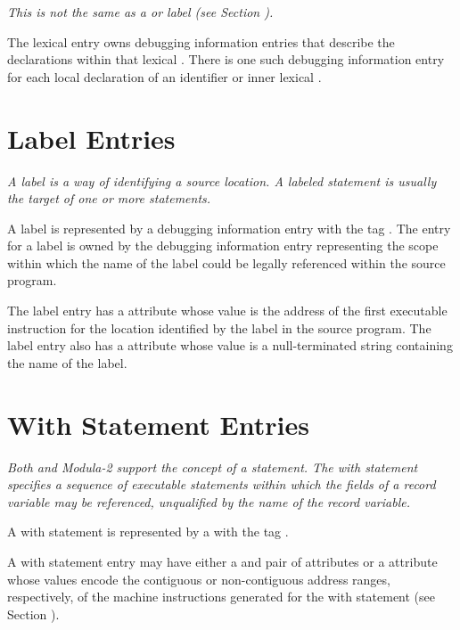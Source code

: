 \textit{This is not the same as a  or
 label (see Section ).}

The lexical  entry owns debugging
information entries that describe the declarations
within that lexical . There is
one such debugging information entry for each local declaration
of an identifier or inner lexical .

\section{Label Entries}
\label{chap:labelentries}
\textit{A label is a way of identifying a source location.
A labeled statement is usually the target of one or more
 statements.}

A label is represented by a debugging information entry with
 the tag \DWTAGlabelTARG.
The entry for a label is owned by
the debugging information entry representing the scope within
which the name of the label could be legally referenced within
the source program.

The label entry has a \DWATlowpc{} attribute whose value
is the address of the first executable instruction for the
location identified by the label in
the source program.  The label entry also has a
\DWATname{} attribute
whose value is a null-terminated string containing
the name of the label.


\section{With Statement Entries}
\label{chap:withstatemententries}

\textit{Both  and
Modula-2 support the concept of a 
statement. The with statement specifies a sequence of
executable statements within which the fields of a record
variable may be referenced, unqualified by the name of the
record variable.}

A with statement is represented by a
with the tag \DWTAGwithstmtTARG.

A with statement entry may have either a
\DWATlowpc{} and
\DWAThighpc{} pair of attributes
or a
\DWATranges{} attribute
whose values encode the contiguous or non-contiguous address
ranges, respectively, of the machine instructions generated
for the with statement
(see Section ).

